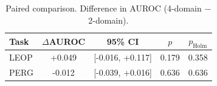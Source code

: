 \begin{table}[htbp]
\centering
\caption{Paired comparison. Difference in AUROC (4-domain $-$ 2-domain).}
\label{tab:paired}
\begin{tabular}{lcccc}
\toprule
Task & $\Delta$AUROC & 95\% CI & $p$ & $p_{\mathrm{Holm}}$ \\
\midrule
LEOP & +0.049 & [-0.016, +0.117] & 0.179 & 0.358 \\
PERG & -0.012 & [-0.039, +0.016] & 0.636 & 0.636 \\
\bottomrule
\end{tabular}
\end{table}
